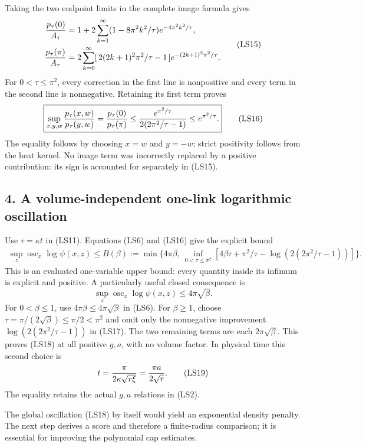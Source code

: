 \documentclass[11pt]{article}
\begin{document}
Taking the two endpoint limits in the complete image formula gives
\[
 \begin{aligned}
 {p_\tau(0)\over A_\tau}
 &=1+2\sum_{k=1}^{\infty}
       (1-8\pi^2k^2/\tau)e^{-4\pi^2k^2/\tau},\\
 {p_\tau(\pi)\over A_\tau}
 &=2\sum_{k=0}^{\infty}
       [\,2(2k+1)^2\pi^2/\tau-1\,]
                             e^{-(2k+1)^2\pi^2/\tau}.
 \end{aligned}
 \tag{LS15}
\]
For \(0<\tau\le\pi^2\), every correction in the first line is
nonpositive and every term in the second line is nonnegative.
Retaining its first term proves
\[
 \boxed{\sup_{x,y,w}{p_\tau(x,w)\over p_\tau(y,w)}
 ={p_\tau(0)\over p_\tau(\pi)}
 \le {e^{\pi^2/\tau}\over2(2\pi^2/\tau-1)}
 \le e^{\pi^2/\tau}.}
 \tag{LS16}
\]
The equality follows by choosing \(x=w\) and \(y=-w\);
strict positivity follows from the heat kernel. No image term
was incorrectly replaced by a positive contribution: its sign
is accounted for separately in (LS15).

\subsection*{4. A volume-independent one-link logarithmic oscillation}

Use \(\tau=\kappa t\) in (LS11). Equations (LS6) and (LS16)
give the explicit bound
\[
 \begin{aligned}
 \sup_z\operatorname{osc}_{x}\log\psi(x,z)
 \le B(\beta):=\min\Big\{4\pi\beta,\
 \inf_{0<\tau\le\pi^2}
  [4\beta\tau+\pi^2/\tau-\log(2(2\pi^2/\tau-1))]\Big\}.
 \end{aligned}
 \tag{LS17}
\]
This is an evaluated one-variable upper bound: every quantity
inside its infimum is explicit and positive. A particularly useful
closed consequence is
\[
 \boxed{\sup_z\operatorname{osc}_{x}\log\psi(x,z)
                                  \le4\pi\sqrt\beta.}
 \tag{LS18}
\]
For \(0<\beta\le1\), use \(4\pi\beta\le4\pi\sqrt\beta\)
in (LS6). For \(\beta\ge1\), choose
\(\tau=\pi/(2\sqrt\beta)\le\pi/2<\pi^2\) and omit only the
nonnegative improvement \(\log(2(2\pi^2/\tau-1))\) in
(LS17). The two remaining terms are each \(2\pi\sqrt\beta\).
This proves (LS18) at all positive \(g,a\), with no volume
factor. In physical time this second choice is
\[
 t={\pi\over2\kappa\sqrt{r\xi}}={\pi a\over2\sqrt r}.
 \tag{LS19}
\]
The equality retains the actual \(g,a\) relations in (LS2).

The global oscillation (LS18) by itself would yield an exponential
density penalty. The next step derives a score and therefore a
finite-radius comparison; it is essential for improving the
polynomial cap estimates.
\end{document}
